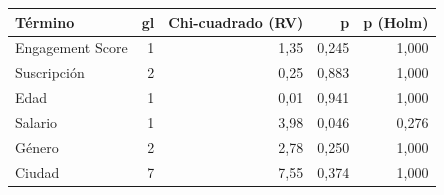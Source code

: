 \begin{tabular}{lrrrr}
\toprule
Término & gl & Chi-cuadrado (RV) & p & p (Holm) \\
\midrule
Engagement Score & 1 & 1,35 & 0,245 & 1,000 \\
Suscripción & 2 & 0,25 & 0,883 & 1,000 \\
Edad & 1 & 0,01 & 0,941 & 1,000 \\
Salario & 1 & 3,98 & 0,046 & 0,276 \\
Género & 2 & 2,78 & 0,250 & 1,000 \\
Ciudad & 7 & 7,55 & 0,374 & 1,000 \\
\bottomrule
\end{tabular}
